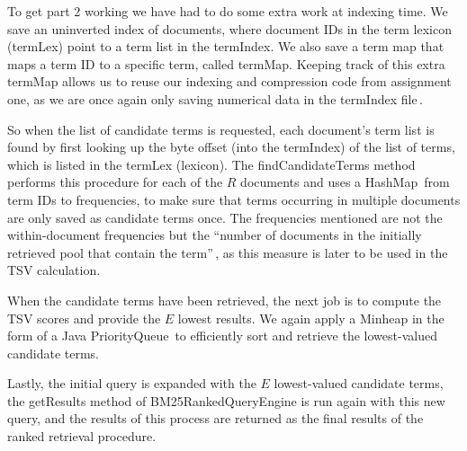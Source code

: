 To get part 2 working we have had to do some extra work at indexing time. We save an uninverted index of documents, where document IDs in the term lexicon (termLex) point to a term list in the termIndex. We also save a term map that maps a term ID to a specific term, called termMap. Keeping track of this extra termMap allows us to reuse our indexing and compression code from assignment one, as we are once again only saving numerical data in the termIndex file\,\cite{dahlsmith13}. 

So when the list of candidate terms is requested, each document's term list is found by first looking up the byte offset (into the termIndex) of the list of terms, which is listed in the termLex (lexicon). The findCandidateTerms method performs this procedure for each of the $R$ documents and uses a HashMap\,\cite{hashmap} from term IDs to frequencies, to make sure that terms occurring in multiple documents are only saved as candidate terms once. The frequencies mentioned are not the within-document frequencies but the ``number of documents in the initially retrieved pool that contain the term''\,\cite{scholer13}, as this measure is later to be used in the TSV calculation.

When the candidate terms have been retrieved, the next job is to compute the TSV scores and provide the $E$ lowest results. We again apply a Minheap in the form of a Java PriorityQueue\,\cite{priorityqueue} to efficiently sort and retrieve the lowest-valued candidate terms.

Lastly, the initial query is expanded with the $E$ lowest-valued candidate terms, the getResults method of BM25RankedQueryEngine is run again with this new query, and the results of this process are returned as the final results of the ranked retrieval procedure.